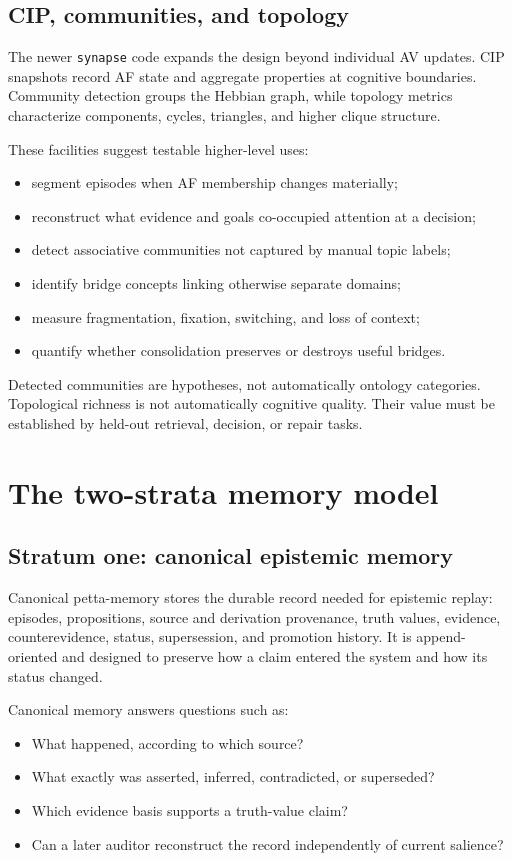 \documentclass[11pt]{article}
\newcommand{\code}[1]{\texttt{#1}}
\begin{document}
\subsection{CIP, communities, and topology}

The newer \code{synapse} code expands the design beyond individual AV updates.
CIP snapshots record AF state and aggregate properties at cognitive boundaries.
Community detection groups the Hebbian graph, while topology metrics characterize
components, cycles, triangles, and higher clique structure.

These facilities suggest testable higher-level uses:
\begin{itemize}
  \item segment episodes when AF membership changes materially;
  \item reconstruct what evidence and goals co-occupied attention at a decision;
  \item detect associative communities not captured by manual topic labels;
  \item identify bridge concepts linking otherwise separate domains;
  \item measure fragmentation, fixation, switching, and loss of context;
  \item quantify whether consolidation preserves or destroys useful bridges.
\end{itemize}
Detected communities are hypotheses, not automatically ontology categories.
Topological richness is not automatically cognitive quality.  Their value must
be established by held-out retrieval, decision, or repair tasks.

\section{The two-strata memory model}

\subsection{Stratum one: canonical epistemic memory}

Canonical petta-memory stores the durable record needed for epistemic replay:
episodes, propositions, source and derivation provenance, truth values,
evidence, counterevidence, status, supersession, and promotion history.  It is
append-oriented and designed to preserve how a claim entered the system and
how its status changed.

Canonical memory answers questions such as:
\begin{itemize}
  \item What happened, according to which source?
  \item What exactly was asserted, inferred, contradicted, or superseded?
  \item Which evidence basis supports a truth-value claim?
  \item Can a later auditor reconstruct the record independently of current salience?
\end{itemize}
\end{document}
